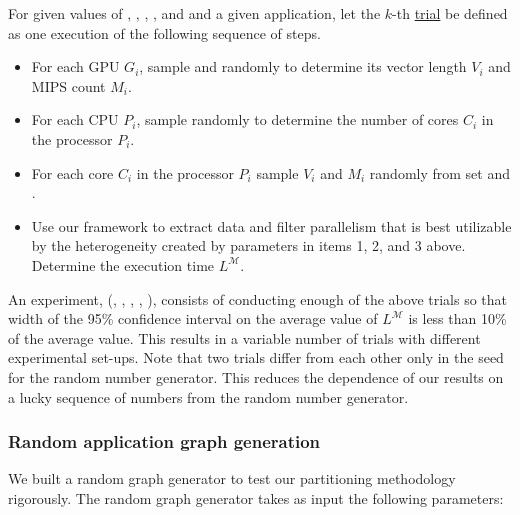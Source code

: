 For given values of \numtplgynodes, \gpunum, \veclenset, \corenumset, \mipsset
and \bw and a given application, let the $k$-th \ul{trial} be
defined as one execution of the following sequence of steps.

\begin{itemize}

\item For each GPU $G_i$, sample \veclenset and \mipsset randomly to
  determine its vector length $V_i$ and MIPS count $M_i$. \label{i1}

\item For each CPU $P_i$, sample \corenumset randomly to determine the
  number of cores $C_i$ in the processor $P_i$.~\label{i2}

\item For each core $C_i$ in the processor $P_i$ sample $V_i$ and $M_i$
  randomly from set \veclenset and \mipsset.

\item Use our framework to extract data and filter parallelism that is
  best utilizable by the heterogeneity created by parameters in items 1,
  2, and 3 above. Determine the execution time
  $L^{\mathcal{M}}$.

\end{itemize}

An experiment, \expt(\numtplgynodes, \gpunum, \veclenset, \corenumset
\mipsset, \bw), consists of conducting enough of the above trials so that
width of the 95\% confidence interval on the average value of
$L^{\mathcal{M}}$ is less than 10\% of the average
value. This results in a variable number of trials with different
experimental set-ups. Note that two trials differ from each other only
in the seed for the random number generator.  This reduces the
dependence of our results on a lucky sequence of numbers from the random
number generator.

\subsubsection{Random application graph generation}
\label{sec:filter-graph-setup}

We built a random graph generator to test our partitioning methodology
rigorously. The random graph generator takes as input the following
parameters:

